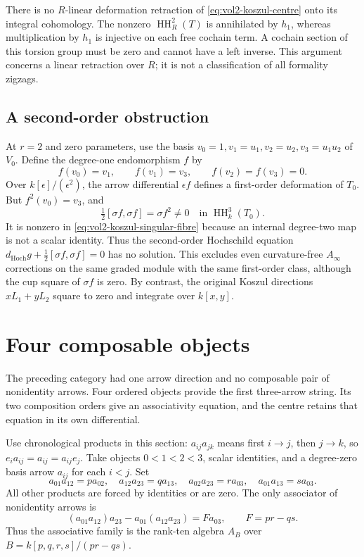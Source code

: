 There is no $R$-linear deformation retraction of
\eqref{eq:vol2-koszul-centre} onto its integral cohomology.
The nonzero $\operatorname{HH}_R^2(T)$ is annihilated by $h_1$,
whereas multiplication by $h_1$ is injective on each free
cochain term. A cochain section of this torsion group must be
zero and cannot have a left inverse. This argument concerns
a linear retraction over $R$; it is not a classification of
all formality zigzags.

\subsection{A second-order obstruction}

At $r=2$ and zero parameters, use the basis
$v_0=1,v_1=u_1,v_2=u_2,v_3=u_1u_2$ of $V_0$. Define the
degree-one endomorphism $f$ by
\[
 f(v_0)=v_1,\qquad f(v_1)=v_3,\qquad f(v_2)=f(v_3)=0.
\]
Over $k[\epsilon]/(\epsilon^2)$, the arrow differential
$\epsilon f$ defines a first-order deformation of $T_0$.
But $f^2(v_0)=v_3$, and
\begin{equation}\label{eq:vol2-koszul-obstruction}
 \tfrac12[\sigma f,\sigma f]=\sigma f^2\ne0
                         \quad\text{in }\operatorname{HH}^3_k(T_0).
\end{equation}
It is nonzero in \eqref{eq:vol2-koszul-singular-fibre} because
an internal degree-two map is not a scalar identity.
Thus the second-order Hochschild equation
$d_{\mathrm{Hoch}}g+\tfrac12[\sigma f,\sigma f]=0$ has no
solution. This excludes even curvature-free $A_\infty$
corrections on the same graded module with the same
first-order class, although the cup square of $\sigma f$
is zero. By contrast, the original Koszul directions
$xL_1+yL_2$ square to zero and integrate over $k[x,y]$.

\section{Four composable objects}
\label{sec:vol2-four-interfaces}

The preceding category had one arrow direction and no composable
pair of nonidentity arrows. Four ordered objects provide the
first three-arrow string. Its two composition orders give an
associativity equation, and the centre retains that equation
in its own differential.

Use chronological products in this section: $a_{ij}a_{jk}$ means
first $i\to j$, then $j\to k$, so $e_ia_{ij}=a_{ij}=a_{ij}e_j$.
Take objects $0<1<2<3$, scalar identities, and a degree-zero
basis arrow $a_{ij}$ for each $i<j$. Set
\begin{equation}\label{eq:vol2-four-products}
 a_{01}a_{12}=pa_{02},\quad a_{12}a_{23}=qa_{13},\quad
 a_{02}a_{23}=ra_{03},\quad a_{01}a_{13}=sa_{03}.
\end{equation}
All other products are forced by identities or are zero.
The only associator of nonidentity arrows is
\[
 (a_{01}a_{12})a_{23}-a_{01}(a_{12}a_{23})
       =Fa_{03},\qquad F=pr-qs.
\]
Thus the associative family is the rank-ten algebra $A_B$ over
$B=k[p,q,r,s]/(pr-qs)$.

